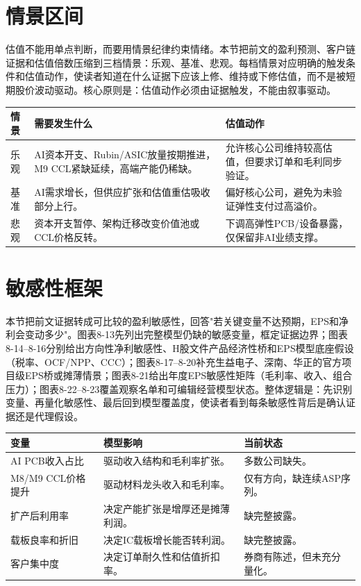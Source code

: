 \section{情景区间}

估值不能用单点判断，而要用情景纪律约束情绪。本节把前文的盈利预测、客户链证据和估值倍数压缩到三档情景：乐观、基准、悲观。每档情景对应明确的触发条件和估值动作，使读者知道在什么证据下应该上修、维持或下修估值，而不是被短期股价波动驱动。核心原则是：估值动作必须由证据触发，不能由叙事驱动。

\begin{dashboardbox}[按情景执行估值纪律]
\small
\begin{tabularx}{\textwidth}{L{2.2cm}X X}
\toprule
\textbf{情景} & \textbf{需要发生什么} & \textbf{估值动作} \\
\midrule
乐观 & AI资本开支、Rubin/ASIC放量按期推进，M9 CCL紧缺延续，高端产能仍稀缺。 & 允许核心公司维持较高估值，但要求订单和毛利同步验证。 \\
基准 & AI需求增长，但供应扩张和估值重估吸收部分上行。 & 偏好核心公司，避免为未验证弹性支付过高溢价。 \\
悲观 & 资本开支暂停、架构迁移改变价值池或CCL价格反转。 & 下调高弹性PCB/设备暴露，仅保留非AI业绩支撑。 \\
\bottomrule
\end{tabularx}
\end{dashboardbox}

\section{敏感性框架}

本节把前文证据转成可比较的盈利敏感性，回答"若关键变量不达预期，EPS和净利会变动多少"。图表8-13先列出完整模型仍缺的敏感变量，框定证据边界；图表8-14--8-16分别给出方向性净利敏感性、H股文件产品经济性桥和EPS模型底座假设（税率、OCF/NPP、CCC）；图表8-17--8-20补充生益电子、深南、华正的官方项目级EPS桥或摊薄情景；图表8-21给出年度EPS敏感性矩阵（毛利率、收入、组合压力）；图表8-22--8-23覆盖观察名单和可编辑经营模型状态。整体逻辑是：先识别变量、再量化敏感性、最后回到模型覆盖度，使读者看到每条敏感性背后是确认证据还是代理假设。

\begin{exhibitbox}[图表8-13：完整估值模型所需敏感变量]
\small
\begin{tabularx}{\textwidth}{L{3cm}X X}
\toprule
\textbf{变量} & \textbf{模型影响} & \textbf{当前状态} \\
\midrule
AI PCB收入占比 & 驱动收入结构和毛利率扩张。 & 多数公司缺失。 \\
M8/M9 CCL价格提升 & 驱动材料龙头收入和毛利率。 & 仅有方向，缺连续ASP序列。 \\
扩产后利用率 & 决定产能扩张是增厚还是摊薄利润。 & 缺完整披露。 \\
载板良率和折旧 & 决定IC载板增长能否转利润。 & 缺完整披露。 \\
客户集中度 & 决定订单耐久性和估值折扣率。 & 券商有陈述，但未充分量化。 \\
\bottomrule
\end{tabularx}
\end{exhibitbox}

